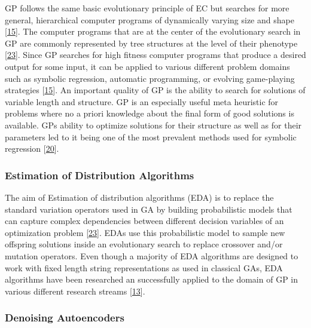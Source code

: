 \documentclass[
  11pt,
]{article}
\begin{document}
GP follows the same basic evolutionary principle of EC but searches for more general, hierarchical computer programs of dynamically varying size and shape {[}\protect\hyperlink{ref-Koza1993GeneticP}{15}{]}.
The computer programs that are at the center of the evolutionary search in GP are commonly represented by tree structures at the level of their phenotype {[}\protect\hyperlink{ref-design_of_modern_heuristics}{23}{]}.
Since GP searches for high fitness computer programs that produce a desired output for some input, it can be applied to various different problem domains such as symbolic regression, automatic programming, or evolving game-playing strategies {[}\protect\hyperlink{ref-Koza1993GeneticP}{15}{]}.
An important quality of GP is the ability to search for solutions of variable length and structure.
GP is an especially useful meta heuristic for problems where no a priori knowledge about the final form of good solutions is available.
GPs ability to optimize solutions for their structure as well as for their parameters led to it being one of the most prevalent methods used for symbolic regression {[}\protect\hyperlink{ref-10.1007ux2f978-3-540-24621-3_22}{20}{]}.

\hypertarget{estimation-of-distribution-algorithms}{%
\subsubsection{Estimation of Distribution Algorithms}\label{estimation-of-distribution-algorithms}}

The aim of Estimation of distribution algorithms (EDA) is to replace the standard variation operators used in GA by building probabilistic models that can capture complex dependencies between different decision variables of an optimization problem {[}\protect\hyperlink{ref-design_of_modern_heuristics}{23}{]}.
EDAs use this probabilistic model to sample new offspring solutions inside an evolutionary search to replace crossover and/or mutation operators.
Even though a majority of EDA algorithms are designed to work with fixed length string representations as used in classical GAs, EDA algorithms have been researched an successfully applied to the domain of GP in various different research streams {[}\protect\hyperlink{ref-kim_probMod_GP}{13}{]}.

\hypertarget{denoising-autoencoders}{%
\subsubsection{Denoising Autoencoders}\label{denoising-autoencoders}}
\end{document}
